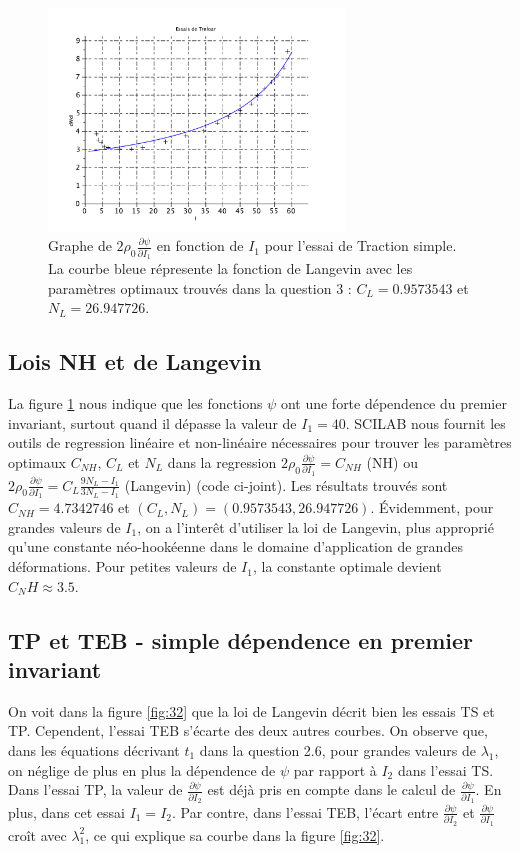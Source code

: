\documentclass[a4paper,11pt]{article}
\begin{document}
\begin{figure}[ht]
\centering
\includegraphics[width=0.7\textwidth]{scilab_prof/q31.pdf}
\caption{Graphe de $2 \rho_0 \frac{\partial\psi}{\partial I_1}$ en fonction de $I_1$ pour l'essai de Traction simple. La courbe bleue répresente la fonction de Langevin avec les paramètres optimaux trouvés dans la question 3 : $C_L = 0.9573543$ et $N_L=26.947726$.}
\label{fig:31}
\end{figure}

\subsection{Lois NH et de Langevin}
La figure \ref{fig:31} nous indique que les fonctions $\psi$ ont une forte dépendence du premier invariant, surtout quand il dépasse la valeur de $I_1 = 40$. SCILAB nous fournit les outils de regression linéaire et non-linéaire nécessaires pour trouver les paramètres optimaux $C_{NH}$, $C_L$ et $N_L$ dans la regression $2 \rho_0 \frac{\partial\psi}{\partial I_1} = C_{NH}$ (NH) ou $2 \rho_0 \frac{\partial\psi}{\partial I_1} = C_L \frac{9N_L-I_1}{3N_L-I_1}$ (Langevin) (code ci-joint). Les résultats trouvés sont $C_{NH} = 4.7342746$ et $(C_L, N_L) = (0.9573543, 26.947726)$. Évidemment, pour grandes valeurs de $I_1$, on a l'interêt d'utiliser la loi de Langevin, plus approprié qu'une constante néo-hookéenne dans le domaine d'application de grandes déformations. Pour petites valeurs de $I_1$, la constante optimale devient $C_NH \approx 3.5$.

\subsection{TP et TEB - simple dépendence en premier invariant}

On voit dans la figure \ref{fig:32} que la loi de Langevin décrit bien les essais TS et TP. Cependent, l'essai TEB s'écarte des deux autres courbes. On observe que, dans les équations décrivant $t_1$ dans la question 2.6, pour grandes valeurs de $\lambda_1$, on néglige de plus en plus la dépendence de $\psi$ par rapport à $I_2$ dans l'essai TS. Dans l'essai TP, la valeur de $\frac{\partial\psi}{\partial I_2}$ est déjà pris en compte dans le calcul de $\frac{\partial\psi}{\partial I_1}$. En plus, dans cet essai $I_1 = I_2$. Par contre, dans l'essai TEB, l'écart entre $\frac{\partial\psi}{\partial I_2}$ et $\frac{\partial\psi}{\partial I_1}$ croît avec $\lambda_1^2$, ce qui explique sa courbe dans la figure \ref{fig:32}.
\end{document}
